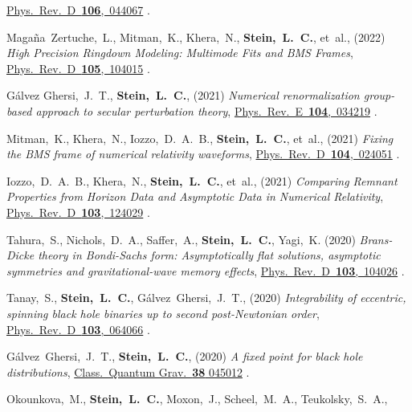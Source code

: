 \begin{etaremune}[start=\value{pubCounter}]
  \href{https://doi.org/10.1103/PhysRevD.106.044067}%
  {Phys.~Rev.~D~{\bf 106},~044067}
  .
\item
  Magaña~Zertuche,~L.,
  Mitman,~K.,
  Khera,~N.,
  {\bf Stein,~L.~C.},
  et~al.,
  (2022)
  {\it High Precision Ringdown Modeling: Multimode Fits and BMS Frames},
  \href{https://doi.org/10.1103/PhysRevD.105.104015}%
  {Phys.~Rev.~D~{\bf 105},~104015}
  .
\item
  Gálvez Ghersi,~J.~T.,
  {\bf Stein,~L.~C.},
  (2021)
  {\it Numerical renormalization group-based approach to secular perturbation theory},
  \href{https://doi.org/10.1103/PhysRevE.104.034219}%
  {Phys.~Rev.~E~{\bf 104},~034219}
  .
\item
  Mitman,~K.,
  Khera,~N.,
  Iozzo,~D.~A.~B.,
  {\bf Stein,~L.~C.},
  et~al.,
  (2021)
  {\it Fixing the BMS frame of numerical relativity waveforms},
  \href{https://doi.org/10.1103/PhysRevD.104.024051}%
  {Phys.~Rev.~D~{\bf 104},~024051}
  .
\item
  Iozzo,~D.~A.~B.,
  Khera,~N.,
  {\bf Stein,~L.~C.},
  et~al.,
  (2021)
  {\it Comparing Remnant Properties from Horizon Data and Asymptotic Data in Numerical Relativity},
  \href{https://doi.org/10.1103/PhysRevD.103.124029}%
  {Phys.~Rev.~D~{\bf 103},~124029}
  .
\item
  Tahura,~S.,
  Nichols,~D.~A.,
  Saffer,~A.,
  {\bf Stein,~L.~C.},
  Yagi,~K.
  (2020)
  {\it Brans-Dicke theory in Bondi-Sachs form: Asymptotically flat solutions, asymptotic symmetries and gravitational-wave memory effects},
  \href{https://doi.org/10.1103/PhysRevD.103.104026}%
  {Phys.~Rev.~D~{\bf 103},~104026}
  .
\item
  Tanay,~S.,
  {\bf Stein,~L.~C.},
  Gálvez~Ghersi,~J.~T.,
  (2020)
  {\it Integrability of eccentric, spinning black hole binaries up to second post-Newtonian order},
  \href{https://doi.org/10.1103/PhysRevD.103.064066}%
  {Phys.~Rev.~D~{\bf 103},~064066}
  .
\item
  Gálvez~Ghersi,~J.~T.,
  {\bf Stein,~L.~C.},
  (2020)
  {\it A fixed point for black hole distributions},
  \href{https://doi.org/10.1088/1361-6382/abcfd2}
  {Class.~Quantum Grav.~{\bf 38} 045012}
  .
\item
  Okounkova,~M.,
  {\bf Stein,~L.~C.},
  Moxon,~J.,
  Scheel,~M.~A.,
  Teukolsky,~S.~A.,

\end{etaremune}
